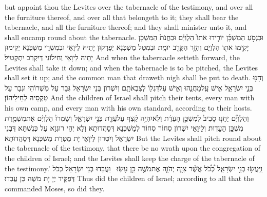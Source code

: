 {but appoint thou the Levites over the tabernacle of the testimony, and over all the furniture thereof, and over all that belongeth to it; they shall bear the tabernacle, and all the furniture thereof; and they shall minister unto it, and shall encamp round about the tabernacle.}{}
{וּבִנְסֹ֣עַ הַמִּשְׁכָּ֗ן יוֹרִ֤ידוּ אֹתוֹ֙ הַלְוִיִּ֔ם וּבַחֲנֹת֙ הַמִּשְׁכָּ֔ן יָקִ֥ימוּ אֹת֖וֹ הַלְוִיִּ֑ם וְהַזָּ֥ר הַקָּרֵ֖ב יוּמָֽת׃}
{וּבְמִטַּל מַשְׁכְּנָא יְפָרְקוּן יָתֵיהּ לֵיוָאֵי וּבְמִשְׁרֵי מַשְׁכְּנָא יְקִימוּן יָתֵיהּ לֵיוָאֵי וְחִילוֹנַי דְּיִקְרַב יִתְקְטִיל׃}
{And when the tabernacle setteth forward, the Levites shall take it down; and when the tabernacle is to be pitched, the Levites shall set it up; and the common man that draweth nigh shall be put to death.}{}
{וְחָנ֖וּ בְּנֵ֣י יִשְׂרָאֵ֑ל אִ֧ישׁ עַֽל\maqqaf מַחֲנֵ֛הוּ וְאִ֥ישׁ עַל\maqqaf דִּגְל֖וֹ לְצִבְאֹתָֽם׃}
{וְיִשְׁרוֹן בְּנֵי יִשְׂרָאֵל גְּבַר עַל מִשְׁרוֹהִי וּגְבַר עַל טִקְסֵיהּ לְחֵילֵיהוֹן׃}
{And the children of Israel shall pitch their tents, every man with his own camp, and every man with his own standard, according to their hosts.}{}
{וְהַלְוִיִּ֞ם יַחֲנ֤וּ סָבִיב֙ לְמִשְׁכַּ֣ן הָעֵדֻ֔ת וְלֹֽא\maqqaf יִהְיֶ֣ה קֶ֔צֶף עַל\maqqaf עֲדַ֖ת בְּנֵ֣י יִשְׂרָאֵ֑ל וְשָׁמְרוּ֙ הַלְוִיִּ֔ם אֶת\maqqaf מִשְׁמֶ֖רֶת מִשְׁכַּ֥ן הָעֵדֽוּת׃}
{וְלֵיוָאֵי יִשְׁרוֹן סְחוֹר סְחוֹר לְמַשְׁכְּנָא דְּסָהֲדוּתָא וְלָא יְהֵי רוּגְזָא עַל כְּנִשְׁתָּא דִּבְנֵי יִשְׂרָאֵל וְיִטְּרוּן לֵיוָאֵי יָת מַטְּרַת מַשְׁכְּנָא דְּסָהֲדוּתָא׃}
{But the Levites shall pitch round about the tabernacle of the testimony, that there be no wrath upon the congregation of the children of Israel; and the Levites shall keep the charge of the tabernacle of the testimony.’}{}
{וַֽיַּעֲשׂ֖וּ בְּנֵ֣י יִשְׂרָאֵ֑ל כְּ֠כֹ֠ל אֲשֶׁ֨ר צִוָּ֧ה יְהֹוָ֛ה אֶת\maqqaf מֹשֶׁ֖ה כֵּ֥ן עָשֽׂוּ׃ \petucha }
{וַעֲבַדוּ בְּנֵי יִשְׂרָאֵל כְּכֹל דְּפַקֵּיד יְיָ יָת מֹשֶׁה כֵּן עֲבַדוּ׃}
{Thus did the children of Israel; according to all that the \lord\space commanded Moses, so did they.}{}

